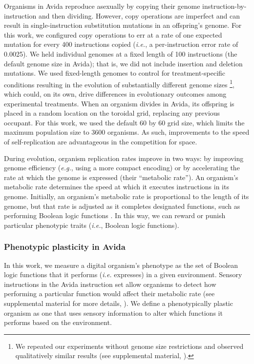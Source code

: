 \begin{raggedbottom}
Organisms in Avida reproduce asexually by copying their genome instruction-by-instruction and then dividing.
However, copy operations are imperfect and can result in single-instruction substitution mutations in an offspring's genome.
For this work, we configured copy operations to err at a rate of one expected mutation for every 400 instructions copied (\textit{i.e.}, a per-instruction error rate of 0.0025).
We held individual genomes at a fixed length of 100 instructions (the default genome size in Avida); that is, we did not include insertion and deletion mutations.
We used fixed-length genomes to control for treatment-specific conditions resulting in the evolution of substantially different genome sizes \citep{supplemental_material}\footnote{
We repeated our experiments without genome size restrictions and observed qualitatively similar results (see supplemental material, \citealt{supplemental_material}).
}, which could, on its own, drive differences in evolutionary outcomes among experimental treatments.
When an organism divides in Avida, its offspring is placed in a random location on the toroidal grid, replacing any previous occupant.
For this work, we used the default 60 by 60 grid size, which limits the maximum population size to 3600 organisms.
As such, improvements to the speed of self-replication are advantageous in the competition for space.

During evolution, organism replication rates improve in two ways: by improving genome efficiency (\textit{e.g.}, using a more compact encoding) or by accelerating the rate at which the genome is expressed (their ``metabolic rate'').
An organism's metabolic rate determines the speed at which it executes instructions in its genome.
Initially, an organism's metabolic rate is proportional to the length of its genome, but that rate is adjusted as it completes designated functions, such as performing Boolean logic functions \citep{ofria_avida:_2009}.
In this way, we can reward or punish particular phenotypic traits (\textit{i.e.}, Boolean logic functions).

\subsubsection{Phenotypic plasticity in Avida}
\label{sec:methods:avida:plasticity}

In this work, we measure a digital organism's phenotype as the set of Boolean logic functions that it performs (\textit{i.e.} expresses) in a given environment.
Sensory instructions in the Avida instruction set allow organisms to detect how performing a particular function would affect their metabolic rate (see supplemental material for more details, \citealt{supplemental_material}).
We define a phenotypically plastic organism as one that uses sensory information to alter which functions it performs based on the environment.


\end{raggedbottom}

